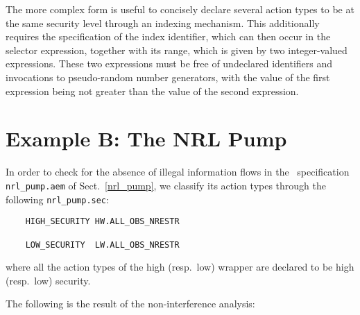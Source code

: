 The more complex form is useful to concisely declare several action types to be at the same security level
through an indexing mechanism. This additionally requires the specification of the index identifier, which
can then occur in the selector expression, together with its range, which is given by two integer-valued
expressions. These two expressions must be free of undeclared identifiers and invocations to pseudo-random
number generators, with the value of the first expression being not greater than the value of the second
expression.



\section{Example B: The NRL Pump}

In order to check for the absence of illegal information flows in the \aemilia\ specification
{\tt nrl\_pump.aem} of Sect.~\ref{nrl_pump}, we classify its action types through the following
{\tt nrl\_pump.sec}:

	\begin{verbatim}
    HIGH_SECURITY HW.ALL_OBS_NRESTR

    LOW_SECURITY  LW.ALL_OBS_NRESTR 
	\end{verbatim}

\noindent where all the action types of the high (resp.\ low) wrapper are declared to be high (resp.\ low)
security.

The following is the result of the non-interference analysis:

